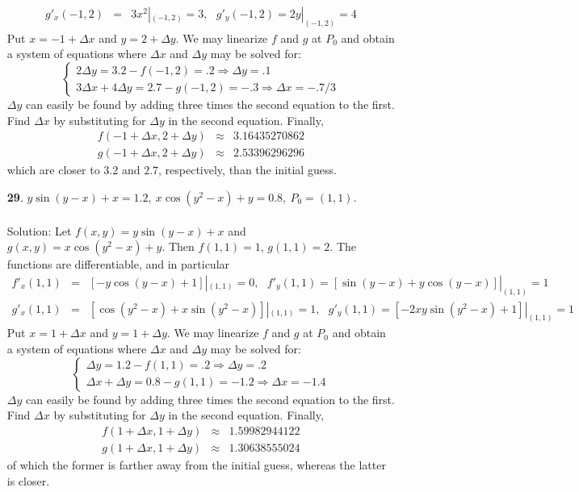 \documentclass[12pt]{amsbook}
\begin{document}
\begin{enumerate}
\begin{eqnarray*}
g'_x(-1,2)&=&3x^2|_{(-1,2)}=3, \ \ \ g'_y(-1,2)=2y|_{(-1,2)}=4 
\end{eqnarray*}
Put $x=-1+\Delta x$ and $y=2+\Delta y$. We may linearize $f$ and $g$ at $P_0$ and obtain a system of equations where $\Delta x$ and $\Delta y$ may be solved for:
\\
$$\begin{cases}
2\Delta y = 3.2-f(-1,2)=.2  \Rightarrow \Delta y=.1 \\
3\Delta x + 4\Delta y=2.7-g(-1,2)=-.3 \Rightarrow \Delta x=-.7/3
\end{cases}$$
$\Delta y$ can easily be found by adding three times the second equation to the first. Find $\Delta x$ by substituting for $\Delta y$ in the second equation. Finally,
\begin{eqnarray*}
f(-1+\Delta x, 2+\Delta y) &\approx & 3.16435270862 \\
g(-1+\Delta x, 2+\Delta y) &\approx & 2.53396296296
\end{eqnarray*}
which are closer to $3.2$ and $2.7$, respectively, than the initial guess.
\\
\item[{\small\bf 29}.] $y\sin(y-x)+x=1.2, \ x\cos(y^2-x)+y=0.8, \ P_0=(1,1)$.
\\
\\
{\sc Solution}: Let $f(x,y)=y\sin(y-x)+x$ and $g(x,y)=x\cos(y^2-x)+y$. Then $f(1,1)=1$, $g(1,1)=2$. The functions are differentiable, and in particular
\begin{eqnarray*}
f'_x(1,1)&=&[-y\cos(y-x)+1]|_{(1,1)}=0, \ \ \ f'_y(1,1)=[\sin(y-x)+y\cos(y-x)]|_{(1,1)}=1 \\
g'_x(1,1)&=&[\cos(y^2-x)+x\sin(y^2-x)]|_{(1,1)}=1, \ \ \ g'_y(1,1)=[-2xy\sin(y^2-x)+1]|_{(1,1)}=1 
\end{eqnarray*}
Put $x=1+\Delta x$ and $y=1+\Delta y$. We may linearize $f$ and $g$ at $P_0$ and obtain a system of equations where $\Delta x$ and $\Delta y$ may be solved for:
\\
$$\begin{cases}
\Delta y = 1.2-f(1,1)=.2  \Rightarrow \Delta y=.2 \\
\Delta x + \Delta y=0.8-g(1,1)=-1.2 \Rightarrow \Delta x=-1.4
\end{cases}$$
$\Delta y$ can easily be found by adding three times the second equation to the first. Find $\Delta x$ by substituting for $\Delta y$ in the second equation. Finally,
\begin{eqnarray*}
f(1+\Delta x, 1+\Delta y) &\approx & 1.59982944122 \\
g(1+\Delta x, 1+\Delta y) &\approx & 1.30638555024
\end{eqnarray*}
of which the former is farther away from the initial guess, whereas the latter is closer.
\\
\end{enumerate}
\end{document}
